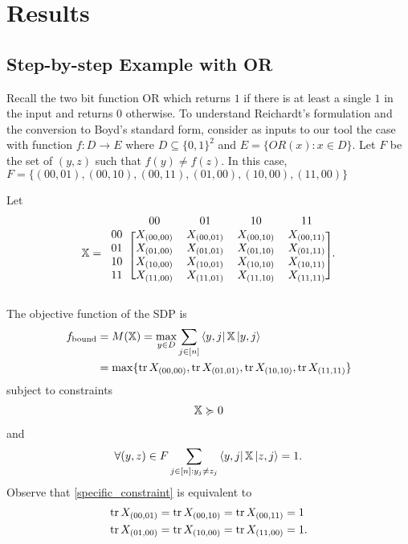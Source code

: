 \section{Results}

\subsection{Step-by-step Example with OR}
Recall the two bit function OR which returns $1$ if there
is at least a single $1$ in the input and returns $0$ otherwise.
To understand Reichardt's formulation and the conversion
to Boyd's standard form, consider as inputs to our tool
the case with function $f: D \rightarrow E$ where
$D \subseteq {\{0,1\}}^2$ and $E =\{OR(x): x \in D \}$.
Let $F$ be the set of $(y,z)$ such that $f(y) \neq f(z)$. In this
case, $F = \{(00,01), (00,10), (00,11), (01,00), (10,00), (11,00)\}$

Let
\begin{align}
\X = \begin{blockarray}{ccccc}
\qquad & 00 & 01 & 10 & 11 \\
\begin{block}{c[cccc]}
  00 & X_{(00,00)} & X_{(00,01)} & X_{(00,10)} & X_{(00,11)}\\
  01 & X_{(01,00)} & X_{(01,01)} & X_{(01,10)} & X_{(01,11)}\\
  10 & X_{(10,00)} & X_{(10,01)} & X_{(10,10)} & X_{(10,11)}\\
  11 & X_{(11,00)} & X_{(11,01)} & X_{(11,10)} & X_{(11,11)}\\
\end{block}
\end{blockarray}. \nonumber 
\end{align}


The objective function of the SDP is
\begin{align} \label{eq:reichardtObj} 
    f_{\text{bound}} &= M(\operatorname{\mathbb{X}}) = \max_{y \in D} \sum_{j \in [n]}
    \bra{y,j}\operatorname{\mathbb{X}}\ket{y,j} \nonumber \\
    &= \max\{ \operatorname{\text{tr}}{X_{(00,00)}}, \operatorname{\text{tr}}{X_{(01,01)}}, \operatorname{\text{tr}}{X_{(10,10)}}, \operatorname{\text{tr}}{X_{(11,11)}} \} \nonumber
\end{align}
subject to constraints
\begin{align}
    \operatorname{\mathbb{X}} \succcurlyeq 0  \nonumber 
\end{align}
and
\begin{align}\label{specific_constraint}
    \forall (y,z) \in F \sum_{j \in [n]: y_j \ne z_j} 
    \bra{y,j} \operatorname{\mathbb{X}} \ket{z, j} = 1.
\end{align}
Observe that \cref{specific_constraint}
is equivalent to
\begin{align}
    \operatorname{\text{tr}}{X_{(00,01)}} &= \operatorname{\text{tr}}{X_{(00,10)}} = \operatorname{\text{tr}}{X_{(00,11)}} = 1 \nonumber \\
    \operatorname{\text{tr}}{X_{(01,00)}} &= \operatorname{\text{tr}}{X_{(10,00)}} = \operatorname{\text{tr}}{X_{(11,00)}} = 1. \nonumber
\end{align}

